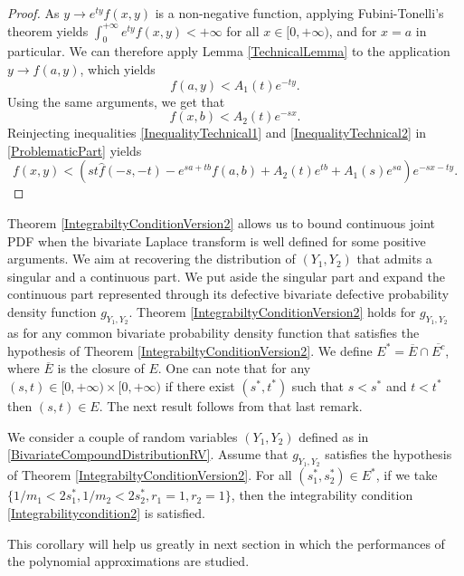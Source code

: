 \begin{proof}
As $y\rightarrow e^{ty}f(x,y)$ is a non-negative function, applying Fubini-Tonelli\rq{}s theorem yields $\int_{0}^{+\infty}e^{ty}f(x,y)<+\infty$ for all $x\in[0,+\infty)$, and for $x=a$ in particular. We can therefore apply Lemma \ref{TechnicalLemma} to the application $y\rightarrow f(a,y)$, which yields
\begin{equation}\label{InequalityTechnical1}
f(a,y)<A_{1}(t)e^{-ty}.
\end{equation}
Using the same arguments, we get that 
\begin{equation}\label{InequalityTechnical2}
f(x,b)<A_{2}(t)e^{-sx}.
\end{equation}
Reinjecting inequalities \eqref{InequalityTechnical1} and \eqref{InequalityTechnical2} in \eqref{ProblematicPart} yields 
\begin{equation}
f(x,y)<(st\widehat{f}(-s,-t)-e^{sa+tb}f(a,b)+A_{2}(t)e^{tb}+A_{1}(s)e^{sa})e^{-sx-ty}.
\end{equation}
\end{proof}
Theorem \ref{IntegrabiltyConditionVersion2} allows us to bound continuous joint PDF when the bivariate Laplace transform is well defined for some positive arguments. We aim at recovering the distribution of $(Y_{1},Y_{2})$ that admits a singular and a continuous part. We put aside the singular part and expand the continuous part represented through its defective bivariate defective probability density function $g_{Y_{1},Y_{2}}$. Theorem \ref{IntegrabiltyConditionVersion2} holds for $g_{Y_{1},Y_{2}}$ as for any common bivariate probability density function that satisfies the hypothesis of Theorem \ref{IntegrabiltyConditionVersion2}. We define $E^{*}=\overline{E}\cap\overline{E^{c}}$, where $\overline{E}$ is the closure of $E$. One can note that for any $(s,t)\in[0,+\infty)\times [0,+\infty)$ if there exist $(s^{*},t^{*})$ such that $s<s^{*}$ and $t<t^{*}$ then $(s,t)\in E$. The next result follows from that last remark.     
\begin{Cor}\label{CorallaryParametrizationVersion2}
We consider a couple of random variables $(Y_{1},Y_{2})$ defined as in \eqref{BivariateCompoundDistributionRV}. Assume that $g_{Y_{1},Y_{2}}$ satisfies the hypothesis of Theorem \ref{IntegrabiltyConditionVersion2}. For all $(s_{1}^{*},s_{2}^{*})\in E^{*}$, if we take  $\{1/m_{1}<2s_{1}^{*},1/m_{2}<2s_{2}^{*},r_{1}=1,r_{2}=1\}$, then the integrability condition \eqref{Integrabilitycondition2} is satisfied.
\end{Cor}    
This corollary will help us greatly in next section in which the performances of the polynomial approximations are studied. 

